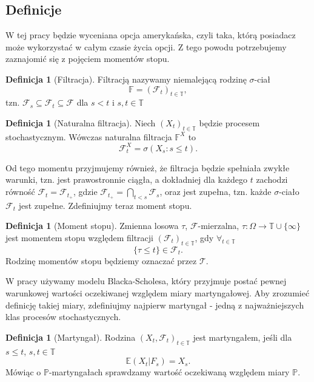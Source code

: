 \documentclass[]{pwr_wmat_praca_dyplomowa}
\theoremstyle{plain}
\numberwithin{theorem}{chapter}
\theoremstyle{definition}
\numberwithin{theorem}{chapter}
\newtheorem{definition}[theorem]{Definicja}
\begin{document}
\subsection{Definicje}
W tej pracy będzie wyceniana opcja amerykańska, czyli taka, którą posiadacz może wykorzystać w całym czasie życia opcji. Z tego powodu potrzebujemy zaznajomić się z pojęciem momentów stopu.

\begin{definition}[Filtracja]
Filtracją nazywamy niemalejącą rodzinę $\sigma$-ciał
$$\mathbb{F} = (\mathcal{F}_t)_{t \in \mathbb{T}},$$
tzn. $\mathcal{F}_s \subseteq \mathcal{F}_t \subseteq \mathcal{F}$ dla $s<t$ i $s,t \in \mathbb{T}$
\end{definition}

\begin{definition}[Naturalna filtracja] 
Niech $(X_t)_{t \in \mathbb{T}}$ będzie procesem stochastycznym. Wówczas naturalna filtracja $\mathbb{F}^X$ to $$\mathcal{F}_t^X = \sigma(X_s: s \leq t).$$
\end{definition}

\noindent Od tego momentu przyjmujemy również, że filtracja będzie spełniała zwykłe warunki, tzn. jest prawostronnie ciągła, a dokładniej dla każdego $t$ zachodzi równość $\mathcal{F}_t = \mathcal{F}_{t_+}$, gdzie $\mathcal{F}_{t_+} = \bigcap_{t<s} \mathcal{F}_s$, oraz jest zupełna, tzn. każde $\sigma$-ciało $\mathcal{F}_t$ jest zupełne.
\newline
\newline
Zdefiniujmy teraz moment stopu.

\begin{definition}[Moment stopu]
Zmienna losowa $\tau$, $\mathcal{F}$-mierzalna, $\tau: \Omega \rightarrow \mathbb{T} \cup \{\infty\}$ jest momentem stopu względem filtracji $(\mathcal{F}_t)_{t \in \mathbb{T}}$, gdy $\forall_{t \in \mathbb{T}}$
$$ \{ \tau \leq t \} \in \mathcal{F}_t.$$ Rodzinę momentów stopu będziemy oznaczać przez $\mathcal{T}.$
\end{definition}

\noindent W pracy używamy modelu Blacka-Scholesa, który przyjmuje postać pewnej warunkowej wartości oczekiwanej względem miary martyngałowej. Aby zrozumieć definicję takiej miary, zdefiniujmy najpierw martyngał - jedną z najważniejszych klas procesów stochastycznych.

\begin{definition}[Martyngał]
Rodzina $(X_t,\mathcal{F}_t)_{t\in \mathbb{T}}$ jest martyngałem, jeśli dla $ s \leq t$, $s,t \in \mathbb{T}$ $$ \mathbb{E}(X_t|F_s) = X_s.$$
Mówiąc o $\mathbb{P}$-martyngałach sprawdzamy wartość oczekiwaną względem miary $\mathbb{P}$.
\end{definition}
\end{document}
